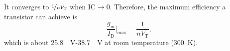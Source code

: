\documentclass{article}[11pt]
\begin{document}
It converges to $\nicefrac{1}{n V_{\mathrm{T}}}$ when $\mathrm{IC} \rightarrow 0$.
Therefore, the maximum efficiency a transistor can achieve is
\begin{equation}\label{eq:gmid-max}
\frac{g_{\mathrm{m}}}{I_{\mathrm{D}}}\bigg|_{\mathrm{max}} = \frac{1}{n V_{\mathrm{T}}},
\end{equation}
which is about \SI{25.8}{\per\volt}-\SI{38.7}{\per\volt} at 
room temperature (\SI{300}{\kelvin}).

\printbibliography
\end{document}
